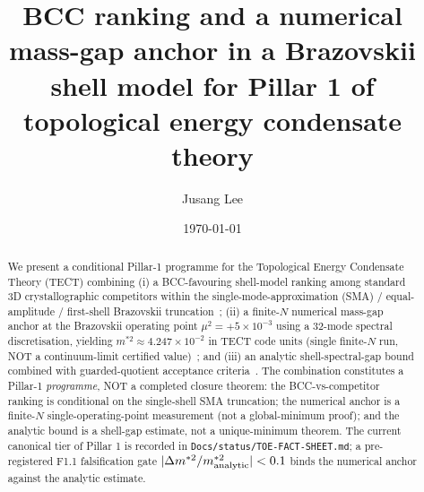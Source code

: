 



\title{BCC ranking and a numerical mass-gap anchor in a Brazovskii shell
model for Pillar 1 of topological energy condensate theory}

\author{Jusang Lee}

\date{\today}

\begin{abstract}
We present a conditional Pillar-1 programme for the Topological Energy
Condensate Theory (TECT) combining (i) a BCC-favouring shell-model
ranking among standard 3D crystallographic competitors within the
single-mode-approximation (SMA) / equal-amplitude / first-shell
Brazovskii truncation~\cite{Math01v2}; (ii) a finite-$N$ numerical
mass-gap anchor at the Brazovskii operating point $\mu^2 = +5 \times
10^{-3}$ using a 32-mode spectral discretisation, yielding
$m^{*2} \approx 4.247 \times 10^{-2}$ in TECT code units (single
finite-$N$ run, NOT a continuum-limit certified value)~\cite{Math82AddF};
and (iii) an analytic shell-spectral-gap bound combined with
guarded-quotient acceptance criteria~\cite{Math82AddH}. The combination
constitutes a Pillar-1 \emph{programme}, NOT a completed closure
theorem: the BCC-vs-competitor ranking is conditional on the
single-shell SMA truncation; the numerical anchor is a finite-$N$
single-operating-point measurement (not a global-minimum proof); and
the analytic bound is a shell-gap estimate, not a unique-minimum
theorem. The current canonical tier of Pillar 1 is recorded in
\texttt{Docs/status/TOE-FACT-SHEET.md}; a pre-registered F1.1
falsification gate $|\Delta m^{*2} / m^{*2}_{\rm analytic}| < 0.1$
binds the numerical anchor against the analytic estimate.
\end{abstract}

